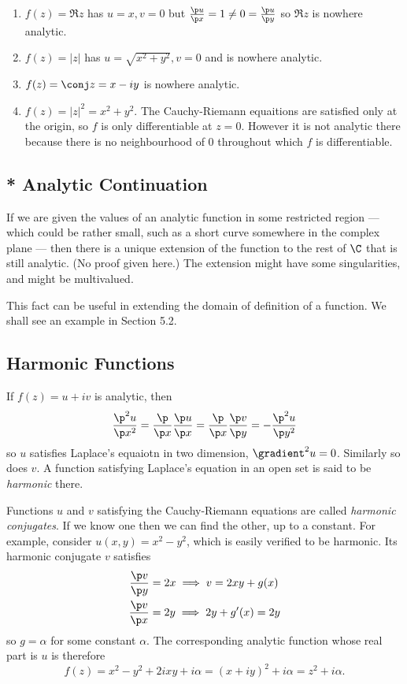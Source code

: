 \documentclass[a4paper]{article}
\begin{document}
\begin{eg}\leavevmode
  \begin{enumerate}
  \item \(f(z) = \Re z\) has \(u = x, v = 0\) but \(\frac{\p u}{\p x} = 1 \neq 0 = \frac{\p u}{\p y}\) so \(\Re z\) is nowhere analytic.
  \item \(f(z) = |z|\) has \(u = \sqrt{x^2 + y^2}, v = 0\) and is nowhere analytic.
  \item \(f(z) = \conj z = x - iy\) is nowhere analytic.
  \item \(f(z) = |z|^2 = x^2 + y^2\). The Cauchy-Riemann equaitions are satisfied only at the origin, so \(f\) is only differentiable at \(z = 0\). However it is not analytic there because there is no neighbourhood of \(0\) throughout which \(f\) is differentiable.
  \end{enumerate}
\end{eg}

\subsection{* Analytic Continuation}

If we are given the values of an analytic function in some restricted region --- which could be rather small, such as a short curve somewhere in the complex plane --- then there is a unique extension of the function to the rest of \(\C\) that is still analytic. (No proof given here.) The extension might have some singularities, and might be multivalued.

This fact can be useful in extending the domain of definition of a function. We shall see an example in Section 5.2.

\subsection{Harmonic Functions}

If \(f(z) = u + iv\) is analytic, then
\[
  \frac{\p^2 u}{\p x^2} = \frac{\p}{\p x} \frac{\p u}{\p x} = \frac{\p}{\p x} \frac{\p v}{\p y} = -\frac{\p^2 u}{\p y^2}
\]
so \(u\) satisfies Laplace's equaiotn in two dimension, \(\gradient^2 u = 0\). Similarly so does \(v\). A function satisfying Laplace's equation in an open set is said to be \emph{harmonic} there.

Functions \(u\) and \(v\) satisfying the Cauchy-Riemann equations are called \emph{harmonic conjugates}. If we know one then we can find the other, up to a constant. For example, consider \(u(x, y) = x^2 - y^2\), which is easily verified to be harmonic. Its harmonic conjugate \(v\) satisfies
\begin{align*}
  \frac{\p v}{\p y} &= 2x \implies v = 2xy + g(x) \\
  \frac{\p v}{\p x} &= 2y \implies 2y + g'(x) = 2y
\end{align*}
so \(g = \alpha\) for some constant \(\alpha\). The corresponding analytic function whose real part is \(u\) is therefore
\[
  f(z) = x^2 - y^2 + 2ixy + i\alpha = (x + iy)^2 + i\alpha = z^2 + i\alpha.
\]
\end{document}
